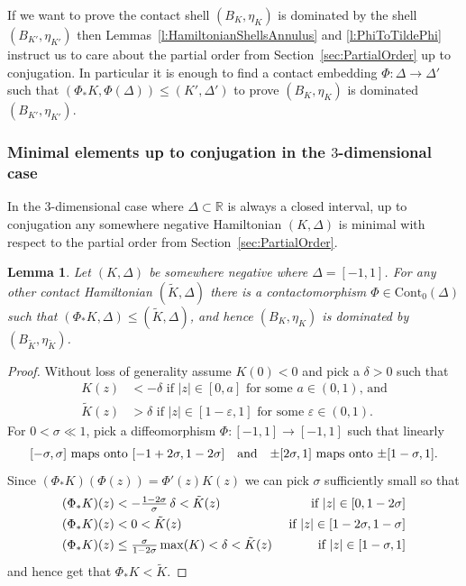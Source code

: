 \documentclass[12pt]{paper}
\theoremstyle{plain}
\newtheorem{lemma}[theorem]{Lemma}
\theoremstyle{definition}
\newcommand{\wt}{\widetilde}
\newcommand{\eps}{\varepsilon}
\newcommand{\abs}[1]{\left| #1 \right|}
\newcommand{\R}{{\mathbb{R}}}
\renewcommand{\max}{{\rm max}}
\newcommand{\CCont}{\mathrm{Cont}}
\numberwithin{figure}{section}
\begin{document}
If we want to prove the contact shell $(B_K, \eta_K)$ is dominated by the shell $(B_{K'}, \eta_{K'})$
then Lemmas~\ref{l:HamiltonianShellsAnnulus} and \ref{l:PhiToTildePhi} instruct us to care about the partial order
from Section~\ref{sec:PartialOrder} up to conjugation.  In particular it is enough to find a contact embedding $\Phi: \Delta \to \Delta'$
such that $(\Phi_*K, \Phi(\Delta)) \leq (K', \Delta')$ to prove $(B_K, \eta_K)$ is dominated $(B_{K'}, \eta_{K'})$.

\subsubsection{Minimal elements up to conjugation in the $3$-dimensional case}

In the $3$-dimensional case where $\Delta \subset \R$ is always a closed interval, 
up to conjugation any somewhere negative Hamiltonian $(K, \Delta)$ is minimal with respect to the partial order from
Section~\ref{sec:PartialOrder}.
 
 \begin{lemma} \label{lm:3-domin}
 Let $(K, \Delta)$ be somewhere negative where $\Delta = [-1, 1]$.  For any other contact Hamiltonian
 $(\wt{K}, \Delta)$ there is a contactomorphism $\Phi \in \CCont_0(\Delta)$ such that
  $(\Phi_*K,\Delta) \leq (\wt K,\Delta)$, and hence $(B_K,\eta_K)$ is dominated by $(B_{\wt K},\eta_{\wt K})$.
% 
% 
 \end{lemma}
\begin{proof}
Without loss of generality assume $K(0) < 0$ and pick a $\delta > 0$ such that
\begin{align*}
K(z) &< -\delta  \mbox{ if $\abs{z} \in [0,a]$ for some $a \in (0,1)$, and}\\
\tilde{K}(z) &> \delta  \mbox{ if $\abs{z} \in [1-\eps, 1]$ for some $\eps \in (0,1)$.}
\end{align*}
For $0 < \sigma \ll 1$, pick a diffeomorphism $\Phi: [-1,1] \to [-1, 1]$ such that linearly
$$
\mbox{$[-\sigma,\sigma]$ maps onto $[-1+2\sigma,1-2\sigma]$\quad and\quad $\pm [2\sigma, 1]$ maps onto $\pm [1-\sigma, 1]$.}
$$
Since $(\Phi_*K)(\Phi(z)) = \Phi'(z) K(z)$ we can pick $\sigma$ sufficiently small so that
\begin{align*}
(\Phi_*K)(z) &< -\tfrac{1-2\sigma}{\sigma}\, \delta < \tilde{K}(z) & \mbox{ if $\abs{z} \in [0, 1-2\sigma]$}\\
(\Phi_*K)(z) &< 0 < \tilde{K}(z) & \mbox{ if $\abs{z} \in [1-2\sigma, 1-\sigma]$}\\
(\Phi_*K)(z) &\leq \tfrac{\sigma}{1-2\sigma}\, \max(K) < \delta < \tilde{K}(z) &\mbox{ if $\abs{z} \in [1-\sigma, 1]$}
\end{align*}
and hence get that $\Phi_*K < \tilde{K}$.
\end{proof}
\end{document}
